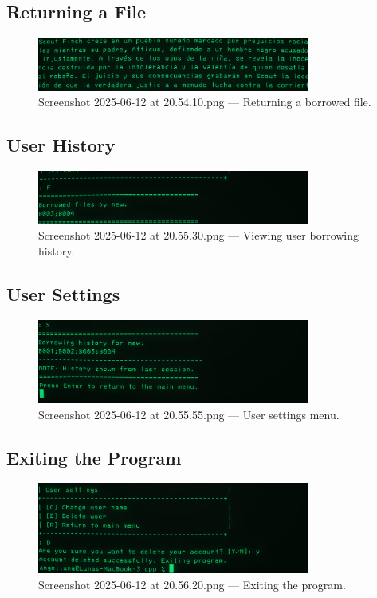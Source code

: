 \documentclass[a4paper,12pt]{article}
\begin{document}
\subsection{Returning a File}
\begin{figure}[ht!]
    \centering
    \includegraphics[width=0.8\textwidth]{Screenshot 2025-06-12 at 20.54.10.png}
    \caption{Screenshot 2025-06-12 at 20.54.10.png --- Returning a borrowed file.}
\end{figure}

\subsection{User History}
\begin{figure}[ht!]
    \centering
    \includegraphics[width=0.8\textwidth]{Screenshot 2025-06-12 at 20.55.30.png}
    \caption{Screenshot 2025-06-12 at 20.55.30.png --- Viewing user borrowing history.}
\end{figure}

\subsection{User Settings}
\begin{figure}[ht!]
    \centering
    \includegraphics[width=0.8\textwidth]{Screenshot 2025-06-12 at 20.55.55.png}
    \caption{Screenshot 2025-06-12 at 20.55.55.png --- User settings menu.}
\end{figure}

\subsection{Exiting the Program}
\begin{figure}[ht!]
    \centering
    \includegraphics[width=0.8\textwidth]{Screenshot 2025-06-12 at 20.56.20.png}
    \caption{Screenshot 2025-06-12 at 20.56.20.png --- Exiting the program.}
\end{figure}


\clearpage

\nocite{*}
\printbibliography
\end{document}
